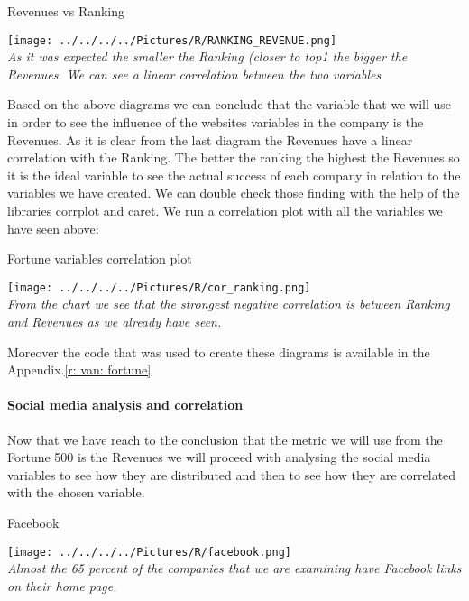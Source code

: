 \documentclass{article}
\begin{document}
\begin{table}[H]
\centering
\caption{Revenues vs Ranking}
\begin{center}
\texttt{[image: ../../../../Pictures/R/RANKING\_REVENUE.png]} \\
\textit{As it was expected the smaller the Ranking (closer to top1 the bigger the Revenues. We can see a linear correlation between the two variables}
\end{center}
\end{table}

Based on the above diagrams we can conclude that the variable that we will use in order to see the influence of the websites variables in the company is the Revenues. As it is clear from the last diagram the Revenues have a linear correlation with the Ranking. The better the ranking the highest the Revenues so it is the ideal variable to see the actual success of each company in relation to the variables we have created. We can double check those finding with the help of the libraries corrplot and caret. We run a correlation plot with all the variables we have seen above:

\begin{table}[H]
\centering
\caption{Fortune variables correlation plot}
\begin{center}
\texttt{[image: ../../../../Pictures/R/cor\_ranking.png]}  \\
\textit{From the chart we see that the strongest negative correlation is between Ranking and Revenues as we already have seen.}
\end{center}
\end{table}

Moreover the code that was used to create these diagrams is available in the Appendix.\ref{r: van: fortune}
\paragraph{Social media analysis and correlation}
Now that we have reach to the conclusion that the metric we will use from the Fortune 500 is the Revenues we will proceed with analysing the social media variables to see how they are distributed and then to see how they are correlated with the chosen variable.\\
\begin{table}[H]
\centering
\caption{Facebook}
\begin{center}
\texttt{[image: ../../../../Pictures/R/facebook.png]}  \\
\textit{Almost the 65 percent of the companies that we are examining have Facebook links on their home page.}
\end{center}
\end{table}
\end{document}
